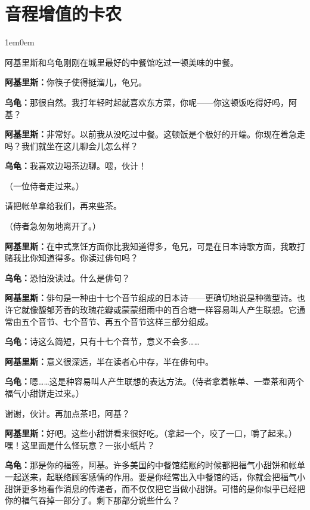 \documentclass[
  12pt,
  twoside,
  openright,
  oldfontcommands,
]{memoir}
\newcommand{\kaitismall}[1]{{\kaitifamily\small #1}}
\newcommand{\dialogname}[1]{{\heifamily\bfseries #1}}
\newenvironment{dialogguide}{%
  \begin{adjustwidth}{1em}{0em}\kaitifamily\itshape\small%
}{%
  \end{adjustwidth}%
}
\begin{document}
\mainmatter
\setcounter{chapter}{5}
\markboth{}{}

\chapter*{音程增值的卡农}

\begin{dialogguide}
阿基里斯和乌龟刚刚在城里最好的中餐馆吃过一顿美味的中餐。
\end{dialogguide}

\dialogname{阿基里斯：}你筷子使得挺溜儿，龟兄。

\dialogname{乌龟：}那很自然。我打年轻时起就喜欢东方菜，你呢------你这顿饭吃得好吗，阿基？

\dialogname{阿基里斯：}非常好。以前我从没吃过中餐。这顿饭是个极好的开端。你现在着急走吗？我们就坐在这儿聊会儿怎么样？

\dialogname{乌龟：}我喜欢边喝茶边聊。喂，伙计！

（一位侍者走过来。）

请把帐单拿给我们，再来些茶。

（侍者急匆匆地离开了。）

\dialogname{阿基里斯：}在中式烹饪方面你比我知道得多，龟兄，可是在日本诗歌方面，我敢打赌我比你知道得多。你读过俳句吗？

\dialogname{乌龟：}恐怕没读过。什么是俳句？

\dialogname{阿基里斯：}俳句是一种由十七个音节组成的日本诗------更确切地说是种微型诗。也许它就像馥郁芳香的玫瑰花瓣或蒙蒙细雨中的百合塘一样容易叫人产生联想。它通常由五个音节、七个音节、再五个音节这样三部分组成。

\dialogname{乌龟：}诗这么简短，只有十七个音节，意义不会多\ldots\ldots{}

\dialogname{阿基里斯：}意义很深远，半在读者心中存，半在俳句中。

\dialogname{乌龟：}嗯\ldots\ldots 这是种容易叫人产生联想的表达方法。\kaitismall{（侍者拿着帐单、一壶茶和两个福气小甜饼走过来。）}

谢谢，伙计。再加点茶吧，阿基？

\dialogname{阿基里斯：}好吧。这些小甜饼看来很好吃。\kaitismall{（拿起一个，咬了一口，嚼了起来。）}嘿！这里面是什么怪玩意？一张小纸片？

\dialogname{乌龟：}那是你的福签，阿基。许多美国的中餐馆结账的时候都把福气小甜饼和帐单一起送来，起联络顾客感情的作用。要是你经常出入中餐馆的话，你就会把福气小甜饼更多地看作消息的传递者，而不仅仅把它当做小甜饼。可惜的是你似乎已经把你的福气吞掉一部分了。剩下那部分说些什么？
\end{document}
